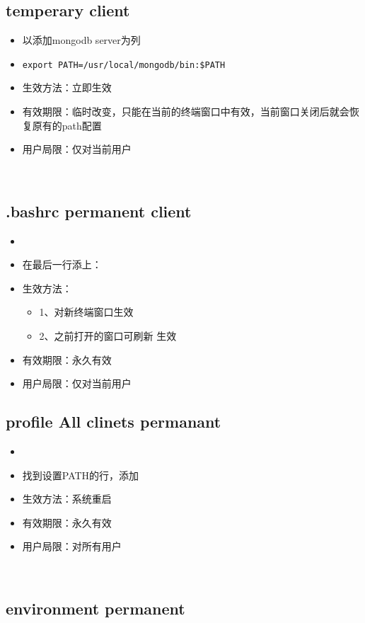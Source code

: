 \subsection{temperary client}

\begin{itemize}
\item 以添加mongodb server为列
\item \verb|export PATH=/usr/local/mongodb/bin:$PATH|
\item 生效方法：立即生效
\item 有效期限：临时改变，只能在当前的终端窗口中有效，当前窗口关闭后就会恢复原有的path配置
\item 用户局限：仅对当前用户
\end{itemize}
 
\subsection{.bashrc permanent client}

\begin{itemize}
\item {}
\item 在最后一行添上： 
\item 生效方法：
  \begin{itemize}
  \item 1、对新终端窗口生效
  \item 2、之前打开的窗口可刷新 生效
  \end{itemize}
\item 有效期限：永久有效
\item 用户局限：仅对当前用户
\end{itemize}

\subsection{profile All clinets permanant}

\begin{itemize}
\item {}
\item 找到设置PATH的行，添加
\item 生效方法：系统重启
\item 有效期限：永久有效
\item 用户局限：对所有用户
\end{itemize}
 
\subsection{environment permanent}

